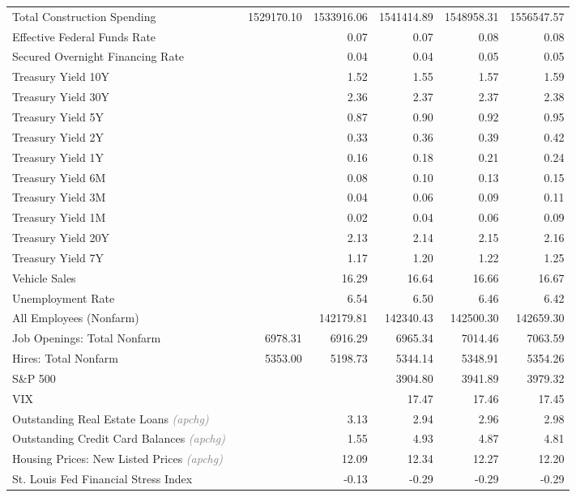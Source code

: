 \documentclass[11pt, letterpaper]{article}\usepackage[]{graphicx}\usepackage[]{color}
\begin{document}
\begin{table}[H]
\begin{tabular}{lrrrrrr}
  Total Construction Spending &  & 1529170.10 & 1533916.06 & 1541414.89 & 1548958.31 & 1556547.57 \\ 
  Effective Federal Funds Rate &  &  & 0.07 & 0.07 & 0.08 & 0.08 \\ 
  Secured Overnight Financing Rate &  &  & 0.04 & 0.04 & 0.05 & 0.05 \\ 
  Treasury Yield 10Y &  &  & 1.52 & 1.55 & 1.57 & 1.59 \\ 
  Treasury Yield 30Y &  &  & 2.36 & 2.37 & 2.37 & 2.38 \\ 
  Treasury Yield 5Y &  &  & 0.87 & 0.90 & 0.92 & 0.95 \\ 
  Treasury Yield 2Y &  &  & 0.33 & 0.36 & 0.39 & 0.42 \\ 
  Treasury Yield 1Y &  &  & 0.16 & 0.18 & 0.21 & 0.24 \\ 
  Treasury Yield 6M &  &  & 0.08 & 0.10 & 0.13 & 0.15 \\ 
  Treasury Yield 3M &  &  & 0.04 & 0.06 & 0.09 & 0.11 \\ 
  Treasury Yield 1M &  &  & 0.02 & 0.04 & 0.06 & 0.09 \\ 
  Treasury Yield 20Y &  &  & 2.13 & 2.14 & 2.15 & 2.16 \\ 
  Treasury Yield 7Y &  &  & 1.17 & 1.20 & 1.22 & 1.25 \\ 
  Vehicle Sales &  &  & 16.29 & 16.64 & 16.66 & 16.67 \\ 
  Unemployment Rate &  &  & 6.54 & 6.50 & 6.46 & 6.42 \\ 
  All Employees (Nonfarm) &  &  & 142179.81 & 142340.43 & 142500.30 & 142659.30 \\ 
  Job Openings: Total Nonfarm &  & 6978.31 & 6916.29 & 6965.34 & 7014.46 & 7063.59 \\ 
  Hires: Total Nonfarm &  & 5353.00 & 5198.73 & 5344.14 & 5348.91 & 5354.26 \\ 
  S\&P 500 &  &  &  & 3904.80 & 3941.89 & 3979.32 \\ 
  VIX &  &  &  & 17.47 & 17.46 & 17.45 \\ 
  Outstanding Real Estate Loans \textit{\footnotesize\textcolor{gray}{(apchg)}} &  &  & 3.13 & 2.94 & 2.96 & 2.98 \\ 
  Outstanding Credit Card Balances \textit{\footnotesize\textcolor{gray}{(apchg)}} &  &  & 1.55 & 4.93 & 4.87 & 4.81 \\ 
  Housing Prices: New Listed Prices \textit{\footnotesize\textcolor{gray}{(apchg)}} &  &  & 12.09 & 12.34 & 12.27 & 12.20 \\ 
  St. Louis Fed Financial Stress Index &  &  & -0.13 & -0.29 & -0.29 & -0.29 \\ 

\end{tabular}
\end{table}
\end{document}
